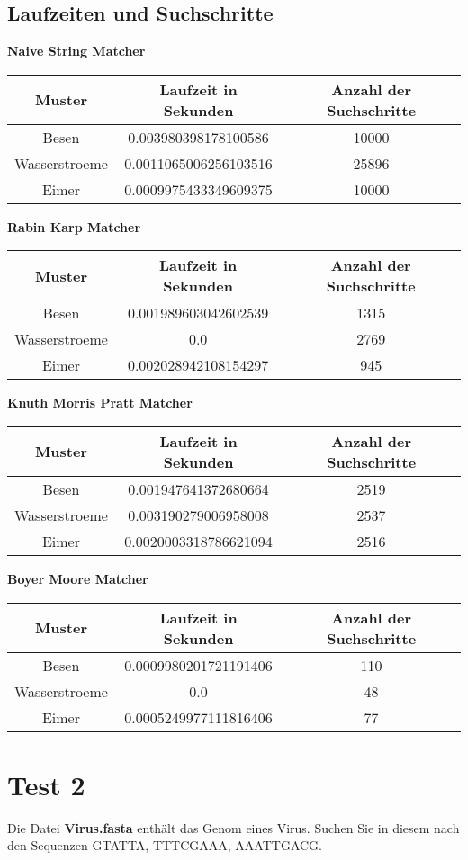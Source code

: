 \documentclass[a4paper,12pt]{article}
\begin{document}
\subsection*{Laufzeiten und Suchschritte}
\textbf{Naive String Matcher}
\newline
\begin{tabular}{c|c|c}
Muster & Laufzeit in Sekunden & Anzahl der Suchschritte  \\
\hline
Besen & 0.003980398178100586 & 10000 \\
Wasserstroeme & 0.0011065006256103516 & 25896 \\
Eimer & 0.0009975433349609375 & 10000
\end{tabular}
\newline \newline
\textbf{Rabin Karp Matcher}
\newline 
\begin{tabular}{c|c|c}
Muster & Laufzeit in Sekunden & Anzahl der Suchschritte  \\
\hline
Besen & 0.001989603042602539 & 1315 \\
Wasserstroeme & 0.0 & 2769 \\
Eimer & 0.002028942108154297 & 945
\end{tabular}
\newpage
\textbf{Knuth Morris Pratt Matcher}
\newline 
\begin{tabular}{c|c|c}
Muster & Laufzeit in Sekunden & Anzahl der Suchschritte  \\
\hline
Besen & 0.001947641372680664 & 2519 \\
Wasserstroeme & 0.003190279006958008 & 2537 \\
Eimer & 0.0020003318786621094 & 2516
\end{tabular}
\newline \newline
\textbf{Boyer Moore Matcher}
\newline 
\begin{tabular}{c|c|c}
Muster & Laufzeit in Sekunden & Anzahl der Suchschritte  \\
\hline
Besen & 0.0009980201721191406 & 110 \\
Wasserstroeme & 0.0 & 48 \\
Eimer & 0.0005249977111816406 & 77
\end{tabular}

\section*{Test 2}
Die Datei \textbf{Virus.fasta} enthält das Genom eines Virus. Suchen Sie in diesem nach den Sequenzen GTATTA, TTTCGAAA, AAATTGACG.
\end{document}
